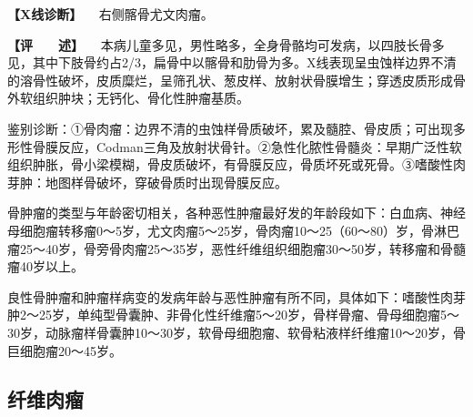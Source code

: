 \textbf{【X线诊断】} 　右侧髂骨尤文肉瘤。

\textbf{【评　　述】}
　本病儿童多见，男性略多，全身骨骼均可发病，以四肢长骨多见，其中下肢骨约占2/3，扁骨中以髂骨和肋骨为多。X线表现呈虫蚀样边界不清的溶骨性破坏，皮质糜烂，呈筛孔状、葱皮样、放射状骨膜增生；穿透皮质形成骨外软组织肿块；无钙化、骨化性肿瘤基质。

鉴别诊断：①骨肉瘤：边界不清的虫蚀样骨质破坏，累及髓腔、骨皮质；可出现多形性骨膜反应，Codman三角及放射状骨针。②急性化脓性骨髓炎：早期广泛性软组织肿胀，骨小梁模糊，骨皮质破坏，有骨膜反应，骨质坏死或死骨。③嗜酸性肉芽肿：地图样骨破坏，穿破骨质时出现骨膜反应。

骨肿瘤的类型与年龄密切相关，各种恶性肿瘤最好发的年龄段如下：白血病、神经母细胞瘤转移瘤0～5岁，尤文肉瘤5～25岁，骨肉瘤10～25（60～80）岁，骨淋巴瘤25～40岁，骨旁骨肉瘤25～35岁，恶性纤维组织细胞瘤30～50岁，转移瘤和骨髓瘤40岁以上。

良性骨肿瘤和肿瘤样病变的发病年龄与恶性肿瘤有所不同，具体如下：嗜酸性肉芽肿2～25岁，单纯型骨囊肿、非骨化性纤维瘤5～20岁，骨样骨瘤、骨母细胞瘤5～30岁，动脉瘤样骨囊肿10～30岁，软骨母细胞瘤、软骨粘液样纤维瘤10～20岁，骨巨细胞瘤20～45岁。

\subsection{纤维肉瘤}

